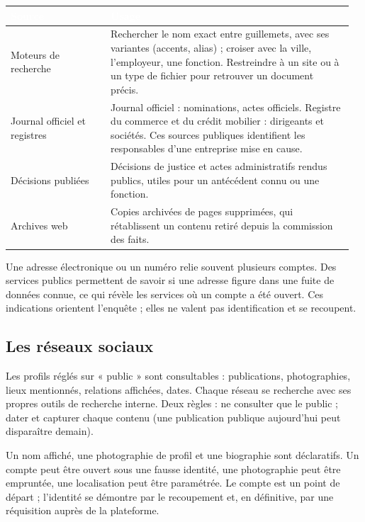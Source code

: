 \begin{longtable}{p{0.28\linewidth}p{0.68\linewidth}}
\rowcolor{TableauEntete}\textcolor{white}{\bfseries Source} & \textcolor{white}{\bfseries Usage} \\ \hline
Moteurs de recherche & Rechercher le nom exact entre guillemets, avec ses variantes (accents, alias) ; croiser avec la ville, l'employeur, une fonction. Restreindre à un site ou à un type de fichier pour retrouver un document précis. \\
Journal officiel et registres & Journal officiel : nominations, actes officiels. Registre du commerce et du crédit mobilier : dirigeants et sociétés. Ces sources publiques identifient les responsables d'une entreprise mise en cause. \\
Décisions publiées & Décisions de justice et actes administratifs rendus publics, utiles pour un antécédent connu ou une fonction. \\
Archives web & Copies archivées de pages supprimées, qui rétablissent un contenu retiré depuis la commission des faits. \\
\end{longtable}

Une adresse électronique ou un numéro relie souvent plusieurs comptes. Des services publics permettent de savoir si une adresse figure dans une fuite de données connue, ce qui révèle les services où un compte a été ouvert. Ces indications orientent l'enquête ; elles ne valent pas identification et se recoupent.

\subsection{Les réseaux sociaux}

Les profils réglés sur « public » sont consultables : publications, photographies, lieux mentionnés, relations affichées, dates. Chaque réseau se recherche avec ses propres outils de recherche interne. Deux règles : ne consulter que le public ; dater et capturer chaque contenu (une publication publique aujourd'hui peut disparaître demain).

\begin{boxalert}
Un nom affiché, une photographie de profil et une biographie sont déclaratifs. Un compte peut être ouvert sous une fausse identité, une photographie peut être empruntée, une localisation peut être paramétrée. Le compte est un point de départ ; l'identité se démontre par le recoupement et, en définitive, par une réquisition auprès de la plateforme.
\end{boxalert}

